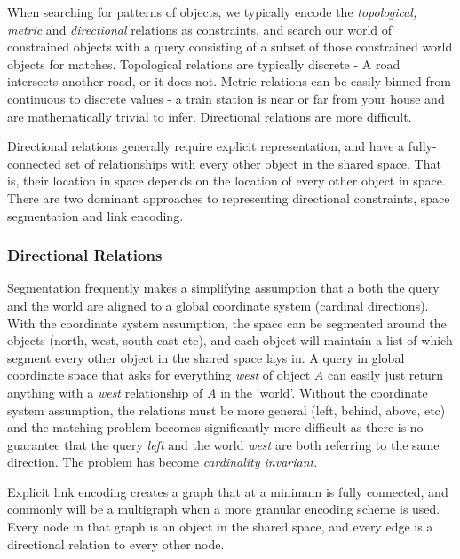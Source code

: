 \par{
    When searching for patterns of objects, we typically encode the \textit{topological, metric} and \textit{directional} relations as constraints, and search our world of constrained objects with a query consisting of a subset of those constrained world objects for matches.
    Topological relations are typically discrete - A road intersects another road, or it does not. 
    Metric relations can be easily binned from continuous to discrete values - a train station is near or far from your house and are mathematically trivial to infer.
    Directional relations are more difficult.
    }

\par{
    Directional relations generally require explicit representation, and have a fully-connected set of relationships with every other object in the shared space.
    That is, their location in space depends on the location of every other object in space. 
    There are two dominant approaches to representing directional constraints, space segmentation and link encoding\cite{Dellapenna2012,Dellapenna2017}. 
    }


\subsubsection{Directional Relations}
\par{    
    Segmentation frequently makes a simplifying assumption that a both the query and the world are aligned to a global coordinate system (cardinal directions).
    With the coordinate system assumption, the space can be segmented around the objects (north, west, south-east etc), and each object will maintain a list of which segment every other object in the shared space lays in.
    A query in global coordinate space that asks for everything \textit{west} of object $A$ can easily just return anything with a \textit{west} relationship of $A$ in the 'world'.
    Without the coordinate system assumption, the relations must be more general (left, behind, above, etc) and the matching problem becomes significantly more difficult as there is no guarantee that the query \textit{left} and the world \textit{west} are both referring to the same direction.
    The problem has become \textit{cardinality invariant}.
    }
\par{
    Explicit link encoding creates a graph that at a minimum is fully connected, and commonly will be a multigraph when a more granular encoding scheme is used.
    Every node in that graph is an object in the shared space, and every edge is a directional relation to every other node. 
}
\
